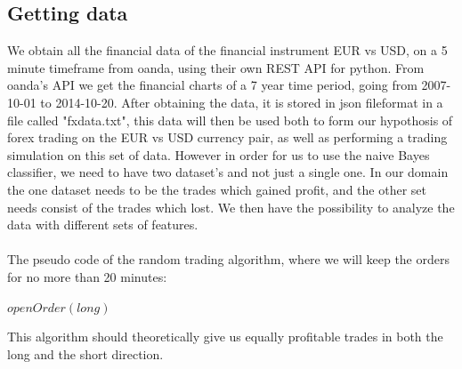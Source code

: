 \documentclass[10pt]{IEEEtran}
\begin{document}
\subsection{Getting data}
We obtain all the financial data of the financial instrument EUR vs USD, on a 5 minute timeframe from oanda, using their own REST API for python. From oanda's API we get the financial charts of a 7 year time period, going from 2007-10-01 to 2014-10-20. After obtaining the data, it is stored in json fileformat in a file called "fxdata.txt", this data will then be used both to form our hypothosis of forex trading on the EUR vs USD currency pair, as well as performing a trading simulation on this set of data. However in order for us to use the naive Bayes classifier, we need to have two dataset's and not just a single one. In our domain the one dataset needs to be the trades which gained profit, and the other set needs consist of the trades which lost. We then have the possibility to analyze the data with different sets of features.\\
\\
The pseudo code of the random trading algorithm, where we will keep the orders for no more than 20 minutes:

\begin{center}
\begin{algorithmic}
    	\State $openOrder(long)$	    
	\EndIf
		\Else
		\EndIf
	\EndFor
\EndWhile
{}
\end{algorithmic}
\end{center}

This algorithm should theoretically give us equally profitable trades in both the long and the short direction.
\end{document}
